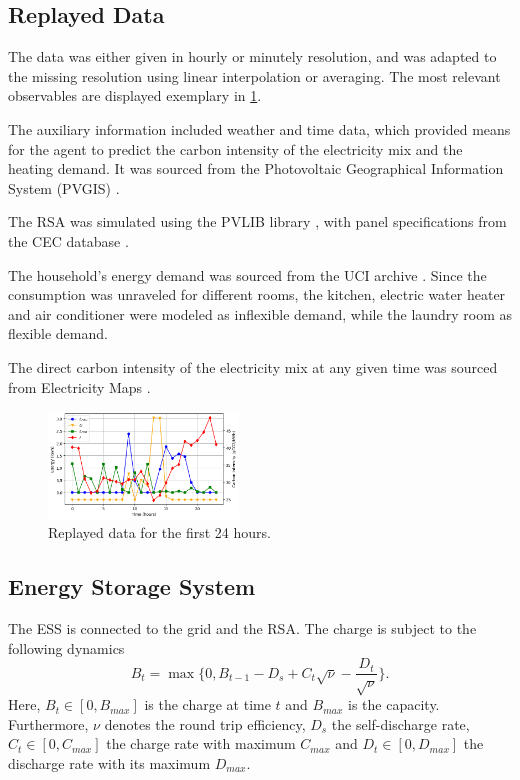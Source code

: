 \subsection{Replayed Data}\label{ssec:static_components}
The data was either given in hourly or minutely resolution, and was adapted to the missing resolution using linear interpolation or averaging. The most relevant observables are displayed exemplary in \cref{fig:static_components}.
\par
The auxiliary information included weather and time data, which provided means for the agent to predict the carbon intensity of the electricity mix and the heating demand. It was sourced from the Photovoltaic Geographical Information System (PVGIS) \cite{ThomasHuld.2012}.
\par
The RSA was simulated using the PVLIB library \cite{F.Holmgren.2018}, with panel specifications from the CEC database \cite{Dobos.2012}\cite{Boyson.2007}.
\par
The household's energy demand was sourced from the UCI archive \cite{GeorgesHebrail.2006}. Since the consumption was unraveled for different rooms, the kitchen, electric water heater and air conditioner were modeled as inflexible demand, while the laundry room as flexible demand.
\par
The direct carbon intensity of the electricity mix at any given time was sourced from Electricity Maps \cite{ElectricityMaps2023}. 
\begin{figure}[H]
    \centering
    \setlength{\abovecaptionskip}{0pt}
    \includegraphics[width=0.45\textwidth]{figures/static_components.png}
    \caption{Replayed data for the first 24 hours.}
    \label{fig:static_components}
\end{figure}

\subsection{Energy Storage System}
The ESS is connected to the grid and the RSA. The charge is subject to the following dynamics
\begin{equation}
    B_t = \max\{0, B_{t-1} - D_s + C_t \sqrt{\nu} - \frac{D_t}{\sqrt{\nu}}\}.
\end{equation}
Here, $B_t \in [0, B_{max}]$ is the charge at time $t$ and $B_{max}$ is the capacity. Furthermore, $\nu$ denotes the round trip efficiency, $D_s$ the self-discharge rate, $C_t \in [0, C_{max}]$ the charge rate with maximum $C_{max}$ and $D_t \in [0, D_{max}]$ the discharge rate with its maximum  $D_{max}$. 

